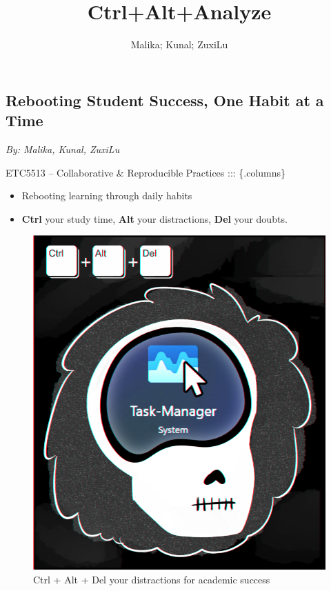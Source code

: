 \documentclass[
  10pt,
  letterpaper,
  DIV=11,
  numbers=noendperiod]{scrartcl}
\title{Ctrl+Alt+Analyze}
\author{Malika; Kunal; ZuxiLu}
\date{}
\providecommand{\tightlist}{%
  \setlength{\itemsep}{0pt}\setlength{\parskip}{0pt}}\usepackage{longtable,booktabs,array}
\renewcommand*\contentsname{Table of contents}
\newcommand\contentsname{Table of contents}
\begin{document}
\maketitle

\renewcommand*\contentsname{Table of contents}
{
\hypersetup{linkcolor=}
\setcounter{tocdepth}{3}
\tableofcontents
}

\newpage

\subsection{\texorpdfstring{\textbf{Rebooting Student Success, One Habit
at a
Time}}{Rebooting Student Success, One Habit at a Time}}\label{rebooting-student-success-one-habit-at-a-time}

\emph{By: Malika, Kunal, ZuxiLu}

ETC5513 -- Collaborative \& Reproducible Practices ::: \{.columns\}

\begin{itemize}
\tightlist
\item
  Rebooting learning through daily habits\\
\item
  \textbf{Ctrl} your study time, \textbf{Alt} your distractions,
  \textbf{Del} your doubts.
\end{itemize}

\begin{figure}[H]

{\centering \includegraphics[width=0.8\linewidth,height=\textheight,keepaspectratio]{figures/CAD.png}

}

\caption{Ctrl + Alt + Del your distractions for academic success}

\end{figure}%
\end{document}
